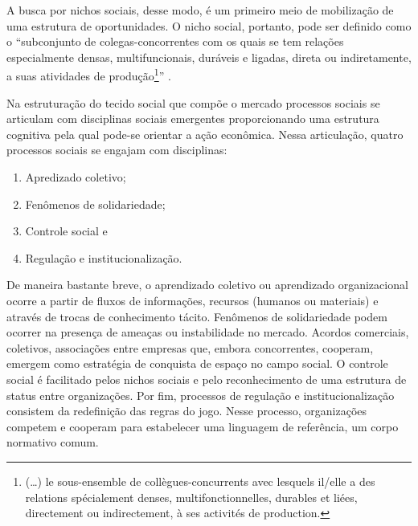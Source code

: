 \documentclass[a4paper, 12pt, openright, oneside, german, french, english, brazil]{abntex2}
\begin{document}
	A busca por nichos sociais, desse modo, é um primeiro meio de mobilização de uma estrutura de oportunidades. O nicho social, portanto, pode ser definido como o ``subconjunto de colegas-concorrentes com os quais se tem relações especialmente densas, multifuncionais, duráveis e ligadas, direta ou indiretamente, a suas atividades de produção\footnote{(\dots) le sous-ensemble de collègues-concurrents avec lesquels il/elle a des relations spécialement denses, multifonctionnelles, durables et liées, directement ou indirectement, à ses activités de production.}'' \cite[p. 575]{lazega2009theorie}.

	Na estruturação do tecido social que compõe o mercado processos sociais se articulam com disciplinas sociais emergentes proporcionando uma estrutura cognitiva pela qual pode-se orientar a ação econômica. Nessa articulação, quatro processos sociais se engajam com disciplinas:

	\begin{enumerate}
		\item Apredizado coletivo;
		\item Fenômenos de solidariedade;
		\item Controle social e
		\item Regulação e institucionalização.
	\end{enumerate}

	De maneira bastante breve, o aprendizado coletivo ou aprendizado organizacional ocorre a partir de fluxos de informações, recursos (humanos ou materiais) e através de trocas de conhecimento tácito. Fenômenos de solidariedade podem ocorrer na presença de ameaças ou instabilidade no mercado. Acordos comerciais, coletivos, associações entre empresas que, embora concorrentes, cooperam, emergem como estratégia de conquista de espaço no campo social. O controle social é facilitado pelos nichos sociais e pelo reconhecimento de uma estrutura de status entre organizações. Por fim, processos de regulação e institucionalização consistem da redefinição das regras do jogo. Nesse processo, organizações competem e cooperam para estabelecer uma linguagem de referência, um corpo normativo comum.
	
	
\end{document}
